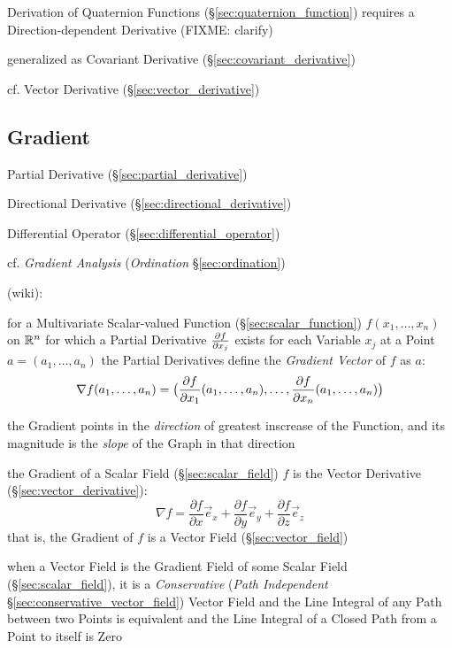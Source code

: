 Derivation of Quaternion Functions (\S\ref{sec:quaternion_function}) requires a
Direction-dependent Derivative (FIXME: clarify)

\fist generalized as Covariant Derivative (\S\ref{sec:covariant_derivative})

cf. Vector Derivative (\S\ref{sec:vector_derivative})



\subsection{Gradient}\label{sec:gradient}

Partial Derivative (\S\ref{sec:partial_derivative})

Directional Derivative (\S\ref{sec:directional_derivative})

Differential Operator (\S\ref{sec:differential_operator})

cf. \emph{Gradient Analysis} (\emph{Ordination} \S\ref{sec:ordination})

(wiki):

for a Multivariate Scalar-valued Function (\S\ref{sec:scalar_function}) $f(x_1,
\ldots, x_n)$ on $\mathbb{R}^n$ for which a Partial Derivative $\frac{\partial{f}}{\partial{x_j}}$
exists for each Variable $x_j$ at a Point $a = (a_1, \ldots, a_n)$ the Partial
Derivatives define the \emph{Gradient Vector} of $f$ as $a$:
\[
  \nabla{f}(a_1, \ldots, a_n) = \big( \frac{\partial{f}}{\partial{x_1}}(a_1, \ldots, a_n), \ldots,
  \frac{\partial{f}}{\partial{x_n}}(a_1, \ldots, a_n) \big)
\]

the Gradient points in the \emph{direction} of greatest inscrease of the
Function, and its magnitude is the \emph{slope} of the Graph in that direction

the Gradient of a Scalar Field (\S\ref{sec:scalar_field}) $f$ is the Vector
Derivative (\S\ref{sec:vector_derivative}):
\[
  \nabla f =
    \frac{\partial f}{\partial x}\vec{e}_x +
    \frac{\partial f}{\partial y}\vec{e}_y +
    \frac{\partial f}{\partial z}\vec{e}_z
\]
that is, the Gradient of $f$ is a Vector Field (\S\ref{sec:vector_field})

when a Vector Field is the Gradient Field of some Scalar Field
(\S\ref{sec:scalar_field}), it is a \emph{Conservative} (\emph{Path
  Independent} \S\ref{sec:conservative_vector_field}) Vector Field and the Line
Integral of any Path between two Points is equivalent and the Line Integral of
a Closed Path from a Point to itself is Zero

